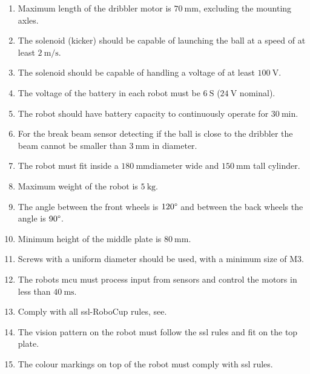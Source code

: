 \begin{enumerate}
    \item Maximum length of the dribbler motor is $70\:\text{mm}$, excluding the mounting axles.
    \item The solenoid (kicker) should be capable of launching the ball at a speed of at least $2\:\text{m/s}$.
    \item The solenoid should be capable of handling a voltage of at least $100\:\text{V}$. 
    \item The voltage of the battery in each robot must be $6\:\text{S}$ ($24\:\text{V}$ nominal).
    \item The robot should have battery capacity to continuously operate for $30\:\text{min}$.
    \item For the break beam sensor detecting if the ball is close to the dribbler the beam cannot be smaller than $3\:\text{mm}$ in diameter.
    \item The robot must fit inside a $180\:\text{mm}$diameter wide and $150\:\text{mm}$ tall cylinder.
    \item Maximum weight of the robot is $5\:\text{kg}$.
    \item The angle between the front wheels is $120\degree$ and between the back wheels the angle is $90\degree$.
    \item Minimum height of the middle plate is $80\:\text{mm}$.
    \item Screws with a uniform diameter should be used, with a minimum size of M3.
    \item The robots \ac{mcu} must process input from sensors and control the motors in less than $40\:\text{ms}$.
    \item Comply with all \ac{ssl}-RoboCup rules, see\:\cite{noauthor_rules_2024}.
    \item The vision pattern on the robot must follow the \ac{ssl} rules and fit on the top plate.
    \item The colour markings on top of the robot must comply with \ac{ssl} rules.
\end{enumerate}



